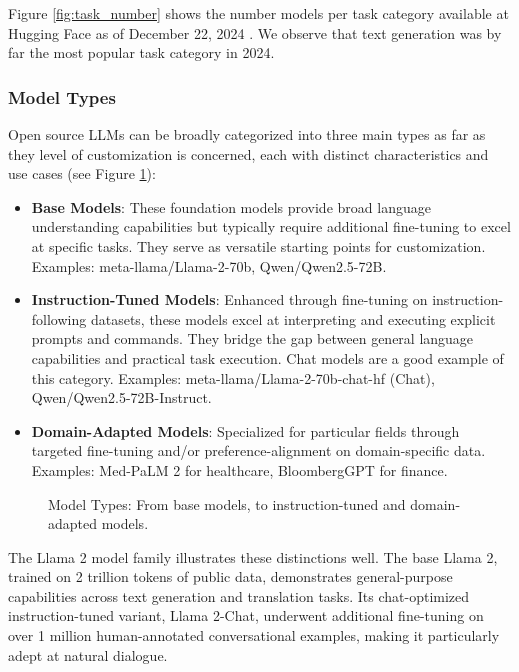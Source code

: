 Figure \ref{fig:task_number} shows the number models per task category available at Hugging Face as of December 22, 2024 . We observe that text generation was by far the most popular task category in 2024.

\subsubsection{Model Types}
 
Open source LLMs can be broadly categorized into three main types as far as they level of customization is concerned, each with distinct characteristics and use cases (see Figure \ref{fig:model_types}):

\begin{itemize}
    \item \textbf{Base Models}: These foundation models provide broad language understanding capabilities but typically require additional fine-tuning to excel at specific tasks. They serve as versatile starting points for customization. Examples: meta-llama/Llama-2-70b, Qwen/Qwen2.5-72B.

    \item \textbf{Instruction-Tuned Models}: Enhanced through fine-tuning on instruction-following datasets, these models excel at interpreting and executing explicit prompts and commands. They bridge the gap between general language capabilities and practical task execution. Chat models are a good example of this category. Examples: meta-llama/Llama-2-70b-chat-hf (Chat), Qwen/Qwen2.5-72B-Instruct.

    \item \textbf{Domain-Adapted Models}: Specialized for particular fields through targeted fine-tuning and/or preference-alignment on domain-specific data. Examples: Med-PaLM 2 for healthcare, BloombergGPT for finance.
\end{itemize}

\begin{figure}[H]
\centering

\caption{Model Types: From base models, to instruction-tuned and domain-adapted models.}
\label{fig:model_types}
\end{figure}

The Llama 2 model family  illustrates these distinctions well. The base Llama 2, trained on 2 trillion tokens of public data, demonstrates general-purpose capabilities across text generation and translation tasks. Its chat-optimized instruction-tuned variant, Llama 2-Chat, underwent additional fine-tuning on over 1 million human-annotated conversational examples, making it particularly adept at natural dialogue.

